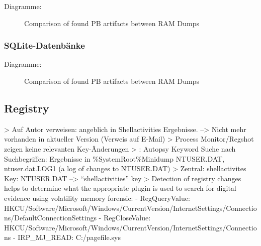 Diagramme:
\begin{figure}[h!]
	\label{chart:final-criteria}  
	\caption{Comparison of found PB artifacts between RAM Dumps}
\end{figure}


\subsubsection*{SQLite-Datenbänke}
Diagramme:
\begin{figure}[h!]
	\label{chart:final-criteria}  
	\caption{Comparison of found PB artifacts between RAM Dumps}
\end{figure}


\subsection*{Registry}
>	Auf Autor verweisen: angeblich in Shellactivities Ergebnisse. --> Nicht mehr vorhanden in aktueller Version (Verweis auf E-Mail)
>	Process Monitor/Regshot zeigen keine relevanten Key-Änderungen
> \cite{Muir.2019}: Autopsy Keyword Suche nach Suchbegriffen: Ergebnisse in \%SystemRoot\%Minidump NTUSER.DAT, ntuser.dat.LOG1 (a log of changes to NTUSER.DAT)
> Zentral: shellactivites Key:	NTUSER.DAT --> “shellactivities” key \cite{Muir.2019}
> \cite{Rochmadi.2017} Detection of registry changes helps to determine what the appropriate plugin is used to search for digital evidence using volatility memory forensic:
- RegQueryValue:	HKCU/Software/Microsoft/Windows/CurrentVersion/InternetSettings/Connections/DefaultConnectionSettings
- RegCloseValue: 	HKCU/Software/Microsoft/Windows/CurrentVersion/InternetSettings/Connections
- IRP\_MJ\_READ: C:/pagefile.sys


